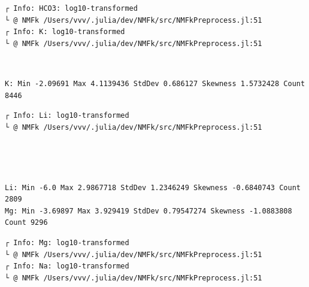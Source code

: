 \documentclass[11pt]{article}
\begin{document}
    \begin{Verbatim}[commandchars=\\\{\}]
┌ Info: HCO3: log10-transformed
└ @ NMFk /Users/vvv/.julia/dev/NMFk/src/NMFkPreprocess.jl:51
┌ Info: K: log10-transformed
└ @ NMFk /Users/vvv/.julia/dev/NMFk/src/NMFkPreprocess.jl:51
    \end{Verbatim}

    \begin{center}
    \end{center}
    { \hspace*{\fill} \\}

    \begin{Verbatim}[commandchars=\\\{\}]
K: Min -2.09691 Max 4.1139436 StdDev 0.686127 Skewness 1.5732428 Count 8446
    \end{Verbatim}

    \begin{Verbatim}[commandchars=\\\{\}]
┌ Info: Li: log10-transformed
└ @ NMFk /Users/vvv/.julia/dev/NMFk/src/NMFkPreprocess.jl:51
    \end{Verbatim}

    \begin{center}
    \end{center}
    { \hspace*{\fill} \\}

    \begin{center}
    \end{center}
    { \hspace*{\fill} \\}

    \begin{Verbatim}[commandchars=\\\{\}]
Li: Min -6.0 Max 2.9867718 StdDev 1.2346249 Skewness -0.6840743 Count 2809
Mg: Min -3.69897 Max 3.929419 StdDev 0.79547274 Skewness -1.0883808 Count 9296
    \end{Verbatim}

    \begin{Verbatim}[commandchars=\\\{\}]
┌ Info: Mg: log10-transformed
└ @ NMFk /Users/vvv/.julia/dev/NMFk/src/NMFkPreprocess.jl:51
┌ Info: Na: log10-transformed
└ @ NMFk /Users/vvv/.julia/dev/NMFk/src/NMFkPreprocess.jl:51
    \end{Verbatim}
\end{document}
